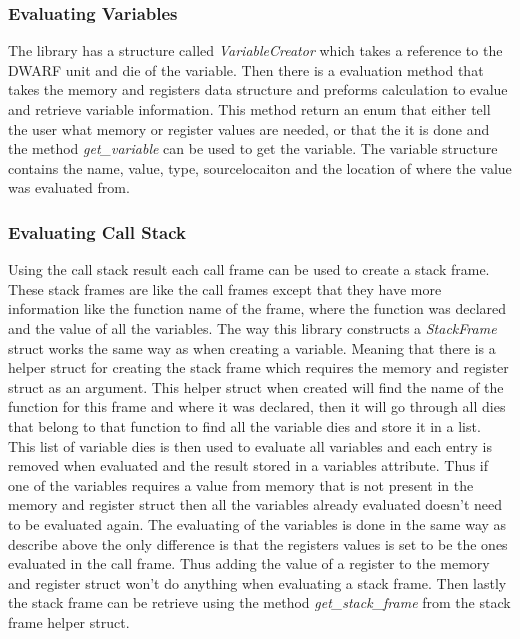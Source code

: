 \subsubsection{Evaluating Variables}
The library has a structure called \emph{VariableCreator} which  takes a reference to the \gls{DWARF} unit and die of the variable.
Then there is a evaluation method that takes the memory and registers data structure and preforms calculation to evalue and retrieve variable information.
This method return an enum that either tell the user what memory or register values are needed, or that the it is done and the method \emph{get\_variable} can be used to get the variable.
The variable structure contains the name, value, type, sourcelocaiton and the location of where the value was evaluated from.


\subsubsection{Evaluating Call Stack}
Using the call stack result each call frame can be used to create a stack frame.
These stack frames are like the call frames except that they have more information like the function name of the frame, where the function was declared and the value of all the variables.
The way this library  constructs a \emph{StackFrame} struct works the same way as when creating a variable.
Meaning that there is a helper struct for creating the stack frame which requires the memory and register struct as an argument.
This helper struct when created will find the name of the function for this frame and where it was declared, then it will go through all dies that belong to that function to find all the variable dies and store it in a list.
This list of variable dies is then used to evaluate all variables and each entry is removed when evaluated and the result stored in a variables attribute.
Thus if one of the variables requires a value from memory that is not present in the memory and register struct then all the variables already evaluated doesn't need to be evaluated again.
The evaluating of the variables is done in the same way as describe above the only difference is that the registers values is set to be the ones evaluated in the call frame.
Thus adding the value of a register to the memory and register struct won't do anything when evaluating a stack frame.
Then lastly the stack frame can be retrieve using the method \emph{get\_stack\_frame} from the stack frame helper struct.


